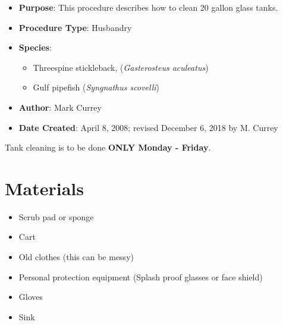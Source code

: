 \documentclass[
  letterpaper,
  DIV=11,
  numbers=noendperiod]{scrreprt}
\providecommand{\tightlist}{%
  \setlength{\itemsep}{0pt}\setlength{\parskip}{0pt}}\usepackage{longtable,booktabs,array}
\begin{document}
\begin{itemize}
\tightlist
\item
  \textbf{Purpose}: This procedure describes how to clean 20 gallon
  glass tanks.
\item
  \textbf{Procedure Type}: Husbandry
\item
  \textbf{Species}:

  \begin{itemize}
  \tightlist
  \item
    Threespine stickleback, (\emph{Gasterosteus aculeatus})
  \item
    Gulf pipefish (\emph{Syngnathus scovelli})
  \end{itemize}
\item
  \textbf{Author}: Mark Currey
\item
  \textbf{Date Created}: April 8, 2008; revised December 6, 2018 by M.
  Currey
\end{itemize}

\begin{tcolorbox}[enhanced jigsaw, toprule=.15mm, breakable, coltitle=black, leftrule=.75mm, title=\textcolor{quarto-callout-important-color}{\faExclamation}\hspace{0.5em}{This is important}, bottomrule=.15mm, toptitle=1mm, bottomtitle=1mm, colframe=quarto-callout-important-color-frame, opacityback=0, colback=white, opacitybacktitle=0.6, colbacktitle=quarto-callout-important-color!10!white, rightrule=.15mm, titlerule=0mm, arc=.35mm, left=2mm]

Tank cleaning is to be done \textbf{ONLY Monday - Friday}.

\end{tcolorbox}

\hypertarget{materials-28}{%
\section{Materials}\label{materials-28}}

\begin{itemize}
\tightlist
\item
  Scrub pad or sponge
\item
  Cart
\item
  Old clothes (this can be messy)
\item
  Personal protection equipment (Splash proof glasses or face shield)
\item
  Gloves
\item
  Sink
\end{itemize}
\end{document}
